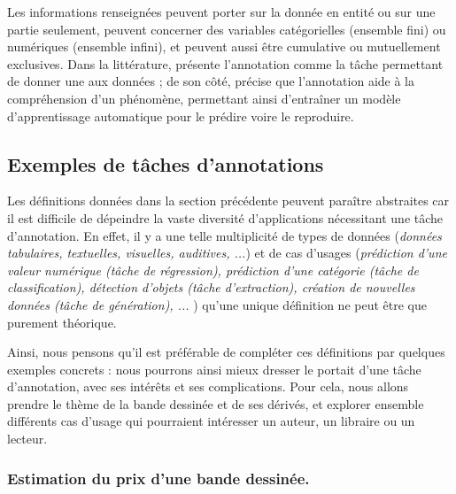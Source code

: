 			Les informations renseignées peuvent porter sur la donnée en entité ou sur une partie seulement, peuvent concerner des variables catégorielles (ensemble fini) ou numériques (ensemble infini), et peuvent aussi être cumulative ou mutuellement exclusives.
			Dans la littérature, \cite{garside-etal:1997:corpus-annotation-linguistic} présente l'annotation comme la tâche permettant de donner une  aux données ; de son côté, \cite{leech:2004:adding-linguistic-annotation} précise que l'annotation aide à la compréhension d'un phénomène, permettant ainsi d'entraîner un modèle d'apprentissage automatique pour le prédire voire le reproduire.
	
	
	\subsection{Exemples de tâches d'annotations}
	\label{section:2.1.2-PRESENTATION-ANNOTATION-EXEMPLES}
		
		Les définitions données dans la section précédente peuvent paraître abstraites car il est difficile de dépeindre la vaste diversité d'applications nécessitant une tâche d'annotation.
		En effet, il y a une telle multiplicité de types de données (\textit{données tabulaires, textuelles, visuelles, auditives, ...}) et de cas d'usages (\textit{prédiction d'une valeur numérique (tâche de régression), prédiction d'une catégorie (tâche de classification), détection d'objets (tâche d'extraction), création de nouvelles données (tâche de génération), ... }) qu'une unique définition ne peut être que purement théorique.
		
		Ainsi, nous pensons qu'il est préférable de compléter ces définitions par quelques exemples concrets : nous pourrons ainsi mieux dresser le portait d'une tâche d'annotation, avec ses intérêts et ses complications.
		Pour cela, nous allons prendre le thème de la bande dessinée et de ses dérivés, et explorer ensemble différents cas d'usage qui pourraient intéresser un auteur, un libraire ou un lecteur.
		
		
		\subsubsection{Estimation du prix d'une bande dessinée.}
		\label{section:2.1.2.A-PRESENTATION-ANNOTATION-EXEMPLES-REGRESSION}
		
